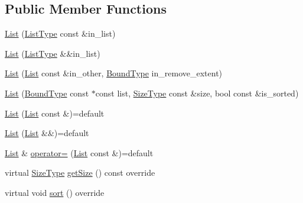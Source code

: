 \subsection*{Public Member Functions}
\begin{DoxyCompactItemize}
\item 
\hyperlink{structvt_1_1group_1_1region_1_1_list_a1c670c1ead337cb8abceecf810e629ca}{List} (\hyperlink{structvt_1_1group_1_1region_1_1_region_a4e35b2fc6dca06aca0b7bc0e19b35c5a}{List\+Type} const \&in\+\_\+list)
\item 
\hyperlink{structvt_1_1group_1_1region_1_1_list_ad065a462795289684b4bce819702c99d}{List} (\hyperlink{structvt_1_1group_1_1region_1_1_region_a4e35b2fc6dca06aca0b7bc0e19b35c5a}{List\+Type} \&\&in\+\_\+list)
\item 
\hyperlink{structvt_1_1group_1_1region_1_1_list_acf3b9e946b2aa160985a65aa15288b82}{List} (\hyperlink{structvt_1_1group_1_1region_1_1_list}{List} const \&in\+\_\+other, \hyperlink{structvt_1_1group_1_1region_1_1_region_abf426ff85bed72c1c6524fad6a9f1751}{Bound\+Type} in\+\_\+remove\+\_\+extent)
\item 
\hyperlink{structvt_1_1group_1_1region_1_1_list_ac23de857aeb512b1129fe62dd50dfe9f}{List} (\hyperlink{structvt_1_1group_1_1region_1_1_region_abf426ff85bed72c1c6524fad6a9f1751}{Bound\+Type} const $\ast$const list, \hyperlink{structvt_1_1group_1_1region_1_1_region_a9bb381adf31111aae34dbc644bad6c1f}{Size\+Type} const \&size, bool const \&is\+\_\+sorted)
\item 
\hyperlink{structvt_1_1group_1_1region_1_1_list_a4f5cfc858b58c690a24f10621351e904}{List} (\hyperlink{structvt_1_1group_1_1region_1_1_list}{List} const \&)=default
\item 
\hyperlink{structvt_1_1group_1_1region_1_1_list_a832f5f93b9542d7a961d0398e1f6cf10}{List} (\hyperlink{structvt_1_1group_1_1region_1_1_list}{List} \&\&)=default
\item 
\hyperlink{structvt_1_1group_1_1region_1_1_list}{List} \& \hyperlink{structvt_1_1group_1_1region_1_1_list_a60aabaef773693847cb82501bfe8d0ad}{operator=} (\hyperlink{structvt_1_1group_1_1region_1_1_list}{List} const \&)=default
\item 
virtual \hyperlink{structvt_1_1group_1_1region_1_1_region_a9bb381adf31111aae34dbc644bad6c1f}{Size\+Type} \hyperlink{structvt_1_1group_1_1region_1_1_list_a9a74188a75483097c41253616527ac46}{get\+Size} () const override
\item 
virtual void \hyperlink{structvt_1_1group_1_1region_1_1_list_acebca171776662bdf481ed1eb7ee4c09}{sort} () override

\end{DoxyCompactItemize}
